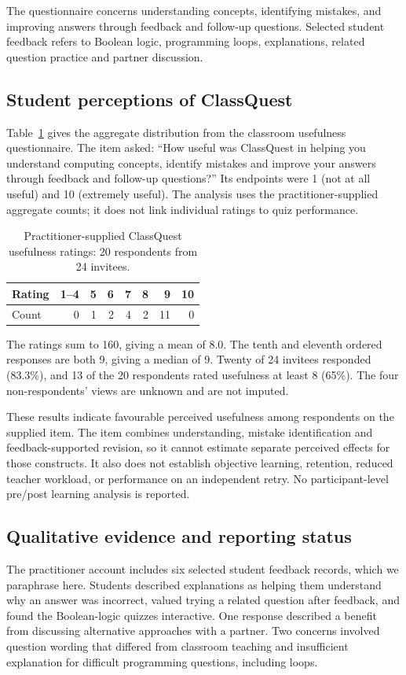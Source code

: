 The questionnaire concerns understanding concepts, identifying mistakes, and improving answers through feedback and follow-up questions. Selected student feedback refers to Boolean logic, programming loops, explanations, related question practice and partner discussion.

\subsection{Student perceptions of ClassQuest}
Table~\ref{tab:cqratings} gives the aggregate distribution from the classroom usefulness questionnaire. The item asked: ``How useful was ClassQuest in helping you understand computing concepts, identify mistakes and improve your answers through feedback and follow-up questions?'' Its endpoints were 1 (not at all useful) and 10 (extremely useful). The analysis uses the practitioner-supplied aggregate counts; it does not link individual ratings to quiz performance.

\begin{table}[ht]
\centering
\caption{Practitioner-supplied ClassQuest usefulness ratings: 20 respondents from 24 invitees.}
\label{tab:cqratings}
\begin{tabular}{lrrrrrrr}
\toprule
Rating & 1--4 & 5 & 6 & 7 & 8 & 9 & 10\\
\midrule
Count & 0 & 1 & 2 & 4 & 2 & 11 & 0\\
\bottomrule
\end{tabular}
\end{table}

The ratings sum to 160, giving a mean of 8.0. The tenth and eleventh ordered responses are both 9, giving a median of 9. Twenty of 24 invitees responded (83.3\%), and 13 of the 20 respondents rated usefulness at least 8 (65\%). The four non-respondents' views are unknown and are not imputed.

These results indicate favourable perceived usefulness among respondents on the supplied item. The item combines understanding, mistake identification and feedback-supported revision, so it cannot estimate separate perceived effects for those constructs. It also does not establish objective learning, retention, reduced teacher workload, or performance on an independent retry. No participant-level pre/post learning analysis is reported.

\subsection{Qualitative evidence and reporting status}
The practitioner account includes six selected student feedback records, which we paraphrase here. Students described explanations as helping them understand why an answer was incorrect, valued trying a related question after feedback, and found the Boolean-logic quizzes interactive. One response described a benefit from discussing alternative approaches with a partner. Two concerns involved question wording that differed from classroom teaching and insufficient explanation for difficult programming questions, including loops.

